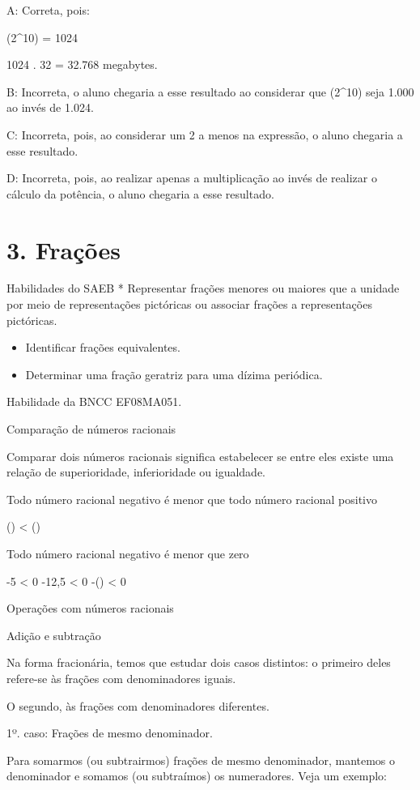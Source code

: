 A: Correta, pois:

(2^10) = 1024

1024 . 32 = 32.768 megabytes.

B: Incorreta, o aluno chegaria a esse resultado ao considerar que
(2^{10}) seja 1.000 ao invés de 1.024.

C: Incorreta, pois, ao considerar um 2 a menos na expressão, o aluno
chegaria a esse resultado.

D: Incorreta, pois, ao realizar apenas a multiplicação ao invés de
realizar o cálculo da potência, o aluno chegaria a esse resultado.


\section{3. Frações}

Habilidades do SAEB * Representar frações menores ou maiores que a
unidade por meio de representações pictóricas ou associar frações a
representações pictóricas.

\begin{itemize}
\item
  Identificar frações equivalentes.
\item
  Determinar uma fração geratriz para uma dízima periódica.
\end{itemize}

Habilidade da BNCC EF08MA051.

Comparação de números racionais

Comparar dois números racionais significa estabelecer se entre eles
existe uma relação de superioridade, inferioridade ou igualdade.

Todo número racional negativo é menor que todo número racional positivo

() \textless{} ()

Todo número racional negativo é menor que zero

-5 \textless{} 0 -12,5 \textless{} 0 -() \textless{} 0

Operações com números racionais

Adição e subtração

Na forma fracionária, temos que estudar dois casos distintos: o primeiro
deles refere-se às frações com denominadores iguais.

O segundo, às frações com denominadores diferentes.

1º. caso: Frações de mesmo denominador.

Para somarmos (ou subtrairmos) frações de mesmo denominador, mantemos o
denominador e somamos (ou subtraímos) os numeradores. Veja um exemplo:

